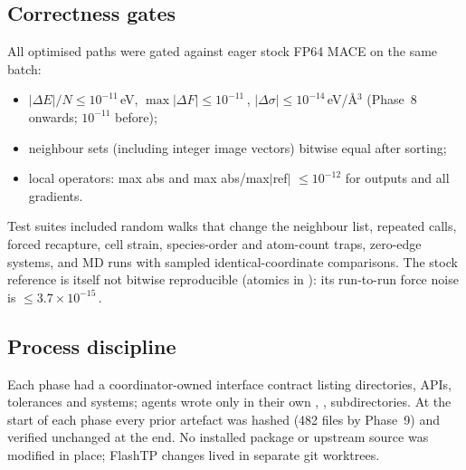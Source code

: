 \subsection{Correctness gates}
All optimised paths were gated against eager stock FP64 MACE on the same batch:
\begin{itemize}
  \item $|\Delta E|/N \le 10^{-11}$\,eV, $\max|\Delta F|\le10^{-11}$\,\eVA, $|\Delta\sigma|\le10^{-14}$\,eV/\AA$^3$ (Phase~8 onwards; $10^{-11}$ before);
  \item neighbour sets (including integer image vectors) bitwise equal after sorting;
  \item local operators: max abs and max abs/max$|$ref$|$ $\le 10^{-12}$ for outputs and all gradients.
\end{itemize}
Test suites included random walks that change the neighbour list, repeated calls, forced recapture, cell strain, species-order and atom-count traps, zero-edge systems, and MD runs with sampled identical-coordinate comparisons. The stock reference is itself not bitwise reproducible (atomics in ): its run-to-run force noise is $\le3.7\times10^{-15}$\,\eVA.

\subsection{Process discipline}
Each phase had a coordinator-owned interface contract listing directories, APIs, tolerances and systems; agents wrote only in their own , ,  subdirectories. At the start of each phase every prior artefact was hashed (482 files by Phase~9) and verified unchanged at the end. No installed package or upstream source was modified in place; FlashTP changes lived in separate git worktrees.
